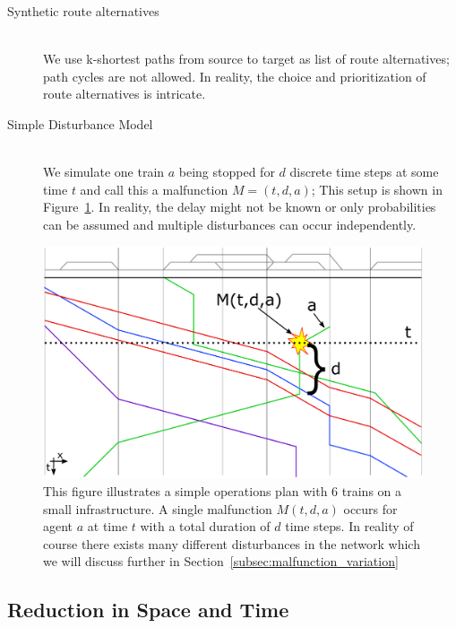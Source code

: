 \documentclass{article}
\begin{document}
\begin{description}
\begin{itemize}
\end{itemize}
\item[Synthetic route alternatives] \hfill \\
We use k-shortest paths from source to target as list of route alternatives; path cycles are not allowed. In reality, the choice and prioritization of route alternatives is intricate.
\item[Simple Disturbance Model] \hfill \\
We simulate one train $a$ being stopped for $d$ discrete time steps at some time $t$ and call this a malfunction $M=(t,d, a)$;  This setup is shown in Figure~\ref{fig:introduction_no_loop}. In reality, the delay might not be known or only probabilities can be assumed and multiple disturbances can occur independently.
\end{description}
%
\begin{figure}[hbtp]
	\centering
  \includegraphics[width=\textwidth]{Figures/malfunction_generation.pdf}
	\caption{This figure illustrates a simple operations plan with 6 trains on a small infrastructure. A single malfunction $M(t,d,a)$ occurs for agent $a$ at time $t$ with a total duration of $d$ time steps. In reality of course there exists many different disturbances in the network which we will discuss further in Section~\ref{subsec:malfunction_variation}}
	\label{fig:introduction_no_loop}
\end{figure}

\subsection{Reduction in Space and Time}\label{subec:slicing}
\end{document}
